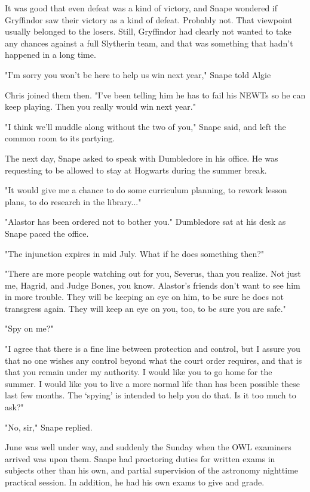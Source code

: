 \documentclass[a4paper,11pt]{article}
\begin{document}
It was good that even defeat was a kind of victory, and Snape wondered if Gryffindor saw their victory as a kind of defeat. Probably not. That viewpoint usually belonged to the losers. Still, Gryffindor had clearly not wanted to take any chances against a full Slytherin team, and that was something that hadn't happened in a long time.

"I'm sorry you won't be here to help us win next year," Snape told Algie

Chris joined them then. "I've been telling him he has to fail his NEWTs so he can keep playing. Then you really would win next year."

"I think we'll muddle along without the two of you," Snape said, and left the common room to its partying.

The next day, Snape asked to speak with Dumbledore in his office. He was requesting to be allowed to stay at Hogwarts during the summer break.

"It would give me a chance to do some curriculum planning, to rework lesson plans, to do research in the library..."

"Alastor has been ordered not to bother you." Dumbledore sat at his desk as Snape paced the office.

"The injunction expires in mid July. What if he does something then?"

"There are more people watching out for you, Severus, than you realize. Not just me, Hagrid, and Judge Bones, you know. Alastor's friends don't want to see him in more trouble. They will be keeping an eye on him, to be sure he does not transgress again. They will keep an eye on you, too, to be sure you are safe."

"Spy on me?"

"I agree that there is a fine line between protection and control, but I assure you that no one wishes any control beyond what the court order requires, and that is that you remain under my authority. I would like you to go home for the summer. I would like you to live a more normal life than has been possible these last few months. The `spying' is intended to help you do that. Is it too much to ask?"

"No, sir," Snape replied.

June was well under way, and suddenly the Sunday when the OWL examiners arrived was upon them. Snape had proctoring duties for written exams in subjects other than his own, and partial supervision of the astronomy nighttime practical session. In addition, he had his own exams to give and grade.
\end{document}
